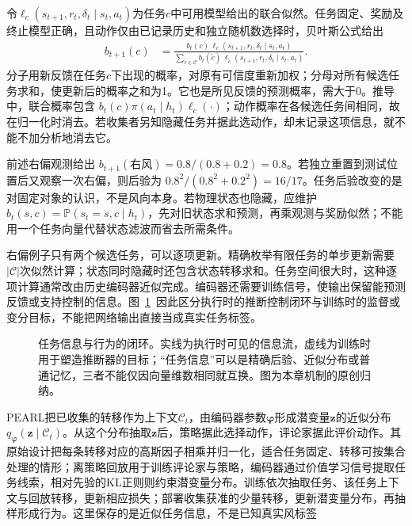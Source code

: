 令$\ell_c(s_{t+1},r_t,\delta_t\mid s_t,a_t)$为任务$c$中可用模型给出的联合似然。任务固定、奖励及终止模型正确，且动作仅由已记录历史和独立随机数选择时，贝叶斯公式给出
\begin{align}
 b_{t+1}(c)
 &=\frac{b_t(c)\,
     \ell_c(s_{t+1},r_t,\delta_t\mid s_t,a_t)}
 {\sum_{\widetilde c\in\mathcal C}b_t(\widetilde c)\,
     \ell_{\widetilde c}(s_{t+1},r_t,\delta_t\mid s_t,a_t)}.
 \label{eq:rl-transfer-belief-update}
\end{align}
分子用新反馈在任务$c$下出现的概率，对原有可信度重新加权；分母对所有候选任务求和，使更新后的概率之和为1。它也是所见反馈的预测概率，需大于0。推导中，联合概率包含
$b_t(c)\pi(a_t\mid h_t)\ell_c(\cdot)$；动作概率在各候选任务间相同，故在归一化时消去。若收集者另知隐藏任务并据此选动作，却未记录这项信息，就不能不加分析地消去它。

前述右偏观测给出
$b_{t+1}(\text{右风})=0.8/(0.8+0.2)=0.8$。若独立重置到测试位置后又观察一次右偏，则后验为
$0.8^2/(0.8^2+0.2^2)=16/17$。任务后验改变的是对固定对象的认识，不是风向本身。若物理状态也隐藏，应维护
$b_t(s,c)=\mathbb P(s_t=s,c\mid h_t)$，先对旧状态求和预测，再乘观测与奖励似然；不能用一个任务向量代替状态滤波而省去所需条件。

右偏例子只有两个候选任务，可以逐项更新。精确枚举有限任务的单步更新需要$|\mathcal C|$次似然计算；状态同时隐藏时还包含状态转移求和。任务空间很大时，这种逐项计算通常改由历史编码器近似完成。编码器还需要训练信号，使输出保留能预测反馈或支持控制的信息。图~\ref{fig:rl-transfer-belief-loop}~因此区分执行时的推断控制闭环与训练时的监督或变分目标，不能把网络输出直接当成真实任务标签。

\begin{figure}[htbp]
 \centering
 
 \caption{任务信息与行为的闭环。实线为执行时可见的信息流，虚线为训练时用于塑造推断器的目标；“任务信息”可以是精确后验、近似分布或普通记忆，三者不能仅因向量维数相同就互换。图为本章机制的原创归纳。}
 \label{fig:rl-transfer-belief-loop}
\end{figure}

PEARL把已收集的转移作为上下文$\mathcal C_t$，由编码器参数$\bm\varphi$形成潜变量$\bm z$的近似分布$q_{\bm\varphi}(\bm z\mid\mathcal C_t)$。从这个分布抽取$\bm z$后，策略据此选择动作，评论家据此评价动作。其原始设计把每条转移对应的高斯因子相乘并归一化，适合任务固定、转移可按集合处理的情形；离策略回放用于训练评论家与策略，编码器通过价值学习信号提取任务线索，相对先验的KL正则则约束潜变量分布。训练依次抽取任务、该任务上下文与回放转移，更新相应损失；部署收集获准的少量转移，更新潜变量分布，再抽样形成行为。这里保存的是近似任务信息，不是已知真实风标签

